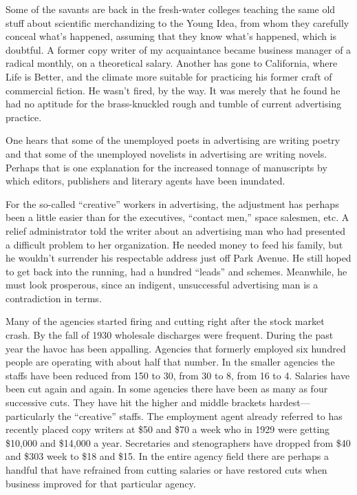 \documentclass[nohyper,openany,nobib]{tufte-book}
\begin{document}
Some of the savants are back in the fresh-water colleges teaching the
same old stuff about scientific merchandizing to the Young Idea, from
whom they carefully conceal what's happened, assuming that they know
what's happened, which is doubtful.
\clearpage
A former copy writer of my acquaintance became business manager of a
radical monthly, on a theoretical salary. Another has gone to
California, where Life is Better, and the climate more suitable for
practicing his former craft of commercial fiction. He wasn't fired, by
the way. It was merely that he found he had no aptitude for the
brass-knuckled rough and tumble of current advertising practice.

One hears that some of the unemployed poets in advertising are writing
poetry and that some of the unemployed novelists in advertising are
writing novels. Perhaps that is one explanation for the increased
tonnage of manuscripts by which editors, publishers and literary agents
have been inundated.

For the so-called ``creative'' workers in advertising, the adjustment
has perhaps been a little easier than for the executives, ``contact
men,'' space salesmen, etc. A relief administrator told the writer about
an advertising man who had presented a difficult problem to her
organization. He needed money to feed his family, but he wouldn't
surrender his respectable address just off Park Avenue. He still hoped
to get back into the running, had a hundred ``leads'' and schemes.
Meanwhile, he must look prosperous, since an indigent, unsuccessful
advertising man is a contradiction in terms.

Many of the agencies started firing and cutting right after the stock
market crash. By the fall of 1930 wholesale discharges were frequent.
During the past year the havoc has been appalling. Agencies that
formerly employed six hundred people are operating with about half that
number. In the smaller agencies the staffs have been reduced from 150 to
30, from 30 to 8, from 16 to 4. Salaries have been cut again and again.
In some agencies there have been as many as four successive cuts. They
have hit the higher and middle brackets hardest---particularly the
``creative'' staffs. The employment agent already referred to has
recently placed copy writers at \$50 and \$70 a week who in 1929 were
getting \$10,000 and \$14,000 a year. Secretaries and stenographers have
dropped from \$40 and \$303 week to \$18 and \$15. In the entire agency
field there are perhaps a handful that have refrained from cutting
salaries or have restored cuts when business improved for that
particular agency.
\end{document}
